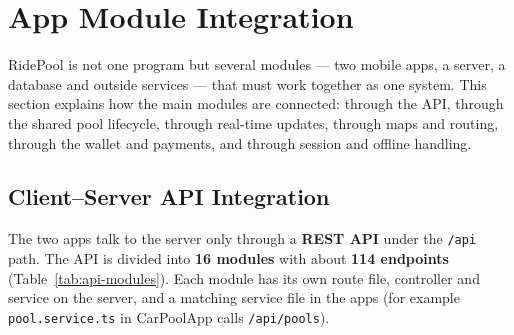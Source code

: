 \section{App Module Integration}
\label{sec:app-integration}

RidePool is not one program but several modules --- two mobile apps, a server,
a database and outside services --- that must work together as one system.
This section explains how the main modules are connected: through the API,
through the shared pool lifecycle, through real-time updates, through maps and
routing, through the wallet and payments, and through session and offline
handling.

\subsection{Client--Server API Integration}
\label{subsec:api}

The two apps talk to the server only through a \textbf{REST API} under the
\texttt{/api} path. The API is divided into \textbf{16 modules} with about
\textbf{114 endpoints} (Table~\ref{tab:api-modules}). Each module has its own
route file, controller and service on the server, and a matching service file
in the apps (for example \texttt{pool.service.ts} in CarPoolApp calls
\texttt{/api/pools}).

